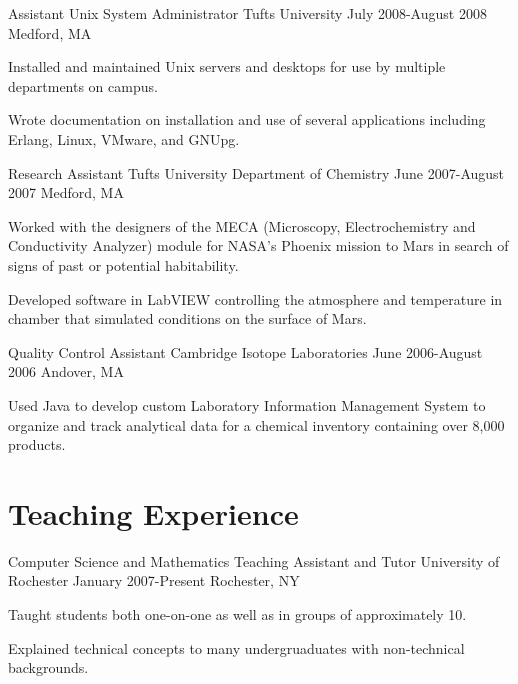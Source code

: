 \documentclass[letterpaper]{resume}
\begin{document}
\affiliation
{Assistant Unix System Administrator}
{Tufts University}
{July 2008-August 2008}
{Medford, MA}

\begin{compactitem}
	\item Installed and maintained Unix servers and desktops for use by multiple departments on campus. \par
	\item Wrote documentation on installation and use of several applications including Erlang, Linux, VMware, and GNUpg. \par
\end{compactitem}

\affiliation
{Research Assistant}
{Tufts University Department of Chemistry}
{June 2007-August 2007}
{Medford, MA}

\begin{compactitem}
	\item Worked with the designers of the MECA (Microscopy, Electrochemistry and Conductivity Analyzer) module for NASA's Phoenix mission to Mars in search of signs of past or potential habitability. \par
	\item Developed software in LabVIEW controlling the atmosphere and temperature in chamber that simulated conditions on the surface of Mars. \par
\end{compactitem}

\affiliation
{Quality Control Assistant}
{Cambridge Isotope Laboratories}
{June 2006-August 2006}
{Andover, MA}

\begin{compactitem}
       \item Used Java to develop custom Laboratory Information Management System to organize and track analytical data for a chemical inventory containing over 8,000 products. \par
\end{compactitem}

\section{Teaching Experience}

\affiliation
{Computer Science and Mathematics Teaching Assistant and Tutor}
{University of Rochester}
{January 2007-Present}
{Rochester, NY}

\begin{compactitem}
	\item Taught students both one-on-one as well as in groups of approximately 10. \par
	\item Explained technical concepts to many undergruaduates with non-technical backgrounds. \par
\end{compactitem}
\end{document}
